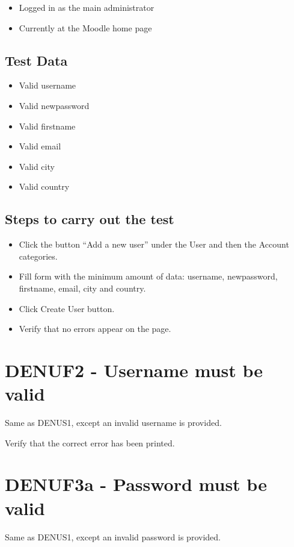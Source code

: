 \documentclass{article}
\begin{document}
\begin{itemize}
  \item Logged in as the main administrator
  \item Currently at the Moodle home page
\end{itemize}

\subsection*{Test Data}

\begin{itemize}
  \item Valid username
  \item Valid newpassword
  \item Valid firstname
  \item Valid email
  \item Valid city
  \item Valid country
\end{itemize}

\subsection*{Steps to carry out the test}

\begin{itemize}
  \item Click the button ``Add a new user'' under the User and then
    the Account categories.
  \item Fill form with the minimum amount of data: username, newpassword,
    firstname, email, city and country.
  \item Click Create User button.
  \item Verify that no errors appear on the page.
\end{itemize}

\section*{DENUF2 - Username must be valid}

Same as DENUS1, except an invalid username is provided.


Verify that the correct error has been printed.

\section*{DENUF3a - Password must be valid}

Same as DENUS1, except an invalid password is provided.
\end{document}
